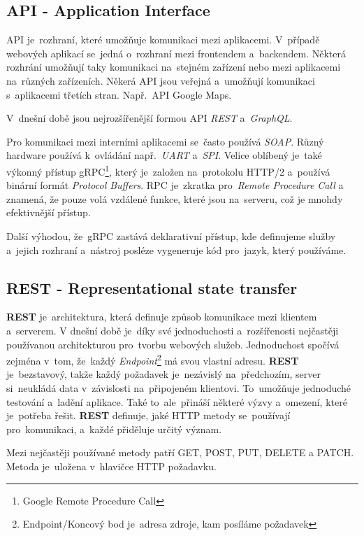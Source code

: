 \documentclass[14pt,a4paper]{article}
\begin{document}
        \subsection{API - Application Interface}
        API je~rozhraní, které umožňuje komunikaci mezi aplikacemi. V~případě webových aplikací se~jedná o~rozhraní mezi frontendem a~backendem.
        Některá rozhrání umožňují taky komunikaci na~stejném zařízení nebo mezi aplikacemi na~různých zařízeních.
        Někerá API jsou veřejná a~umožňují komunikaci s~aplikacemi třetích stran. Např.~API Google Maps.

        V~dnešní době jsou nejrozšířenější formou API \emph{REST} a~\emph{GraphQL}.

        Pro komunikaci mezi interními aplikacemi se~často používá \emph{SOAP}. Různý hardware používá k~ovládání např.~\emph{UART} a~\emph{SPI}.
        Velice oblíbený je~také výkonný přístup gRPC\footnote{Google Remote Procedure Call}, který je~založen na~protokolu HTTP/2 a~používá binární formát \emph{Protocol Buffers}.
        RPC je~zkratka pro~\emph{Remote Procedure Call} a znamená, že pouze volá vzdálené funkce, které jsou na~serveru,
        což je mnohdy efektivnější přístup.
        
        Další výhodou, že~gRPC zastává deklarativní přístup, kde definujeme služby a~jejich rozhraní a~nástroj posléze vygeneruje kód pro~jazyk, který používáme.

        \subsection{REST - Representational state transfer}
        \textbf{REST} je~architektura, která definuje způsob komunikace mezi klientem a~serverem.
        V dnešní době je~díky své jednoduchosti a~rozšířenosti nejčastěji používanou architekturou pro~tvorbu webových služeb.
        Jednoduchost spočívá zejména v~tom, že~každý \emph{Endpoint}\footnote{Endpoint/Koncový bod je~adresa zdroje, kam posíláme požadavek}
        má svou vlastní adresu.
        \textbf{REST} je~bezstavový, takže každý požadavek je~nezávislý na~předchozím, server si~neukládá data v~závislosti na~připojeném klientovi.
        To~umožňuje jednoduché testování a~ladění aplikace. Také to~ale~přináší některé výzvy a~omezení, které je~potřeba řešit.
        \textbf{REST} definuje, jaké HTTP metody se~používají pro~komunikaci, a~každé přiděluje určitý význam.
    
        Mezi nejčastěji používané metody patří GET, POST, PUT, DELETE a PATCH. Metoda je~uložena v~hlavičce HTTP požadavku.
\end{document}
